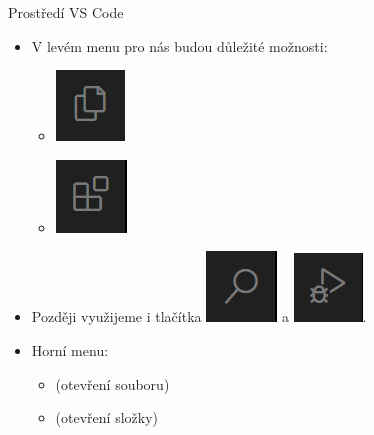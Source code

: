 \documentclass[14pt]{beamer}
\begin{document}
    \begin{frame}[t]{Prostředí VS Code}
        \begin{itemize}
            \item V levém menu pro nás budou důležité možnosti:
            \begin{itemize}
                \item \includegraphics[height=\inlineimgscale\fontcharht\font`\B]{images/vs_code_files_icon.png} 
                \item \includegraphics[height=\inlineimgscale\fontcharht\font`\B]{images/vs_code_extensions_icon.png} 
            \end{itemize}
            \item Později využijeme i tlačítka \includegraphics[height=\inlineimgscale\fontcharht\font`\B]{images/vs_code_search_icon.png} a \includegraphics[height=\fontcharht\font`\B]{images/vs_code_debug_icon.png}.
            \item Horní menu:
            \begin{itemize}
                \item {} (otevření souboru)
                \item {} (otevření složky)
            \end{itemize}
        \end{itemize}
    \end{frame}
\end{document}
